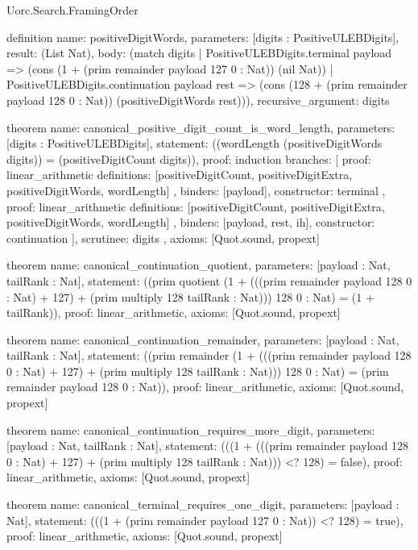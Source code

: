 \begin{lexlean}{Uorc.Search.FramingOrder}
\begin{semanticmodule}
definition{
  name: positiveDigitWords,
  parameters: [digits : PositiveULEBDigits],
  result: (List Nat),
  body: (match digits
    | PositiveULEBDigits.terminal payload => (cons (1 + (prim remainder payload 127 0 : Nat)) (nil Nat))
    | PositiveULEBDigits.continuation payload rest => (cons (128 + (prim remainder payload 128 0 : Nat)) (positiveDigitWords rest))),
  recursive_argument: digits
}

theorem{
  name: canonical_positive_digit_count_is_word_length,
  parameters: [digits : PositiveULEBDigits],
  statement: ((wordLength (positiveDigitWords digits)) = (positiveDigitCount digits)),
  proof: induction{
    branches: [
      {
        proof: linear_arithmetic{
          definitions: [positiveDigitCount, positiveDigitExtra, positiveDigitWords, wordLength]
        },
        binders: [payload],
        constructor: terminal
      },
      {
        proof: linear_arithmetic{
          definitions: [positiveDigitCount, positiveDigitExtra, positiveDigitWords, wordLength]
        },
        binders: [payload, rest, ih],
        constructor: continuation
      }
    ],
    scrutinee: digits
  },
  axioms: [Quot.sound, propext]
}

theorem{
  name: canonical_continuation_quotient,
  parameters: [payload : Nat, tailRank : Nat],
  statement: ((prim quotient (1 + (((prim remainder payload 128 0 : Nat) + 127) + (prim multiply 128 tailRank : Nat))) 128 0 : Nat) = (1 + tailRank)),
  proof: linear_arithmetic{},
  axioms: [Quot.sound, propext]
}

theorem{
  name: canonical_continuation_remainder,
  parameters: [payload : Nat, tailRank : Nat],
  statement: ((prim remainder (1 + (((prim remainder payload 128 0 : Nat) + 127) + (prim multiply 128 tailRank : Nat))) 128 0 : Nat) = (prim remainder payload 128 0 : Nat)),
  proof: linear_arithmetic{},
  axioms: [Quot.sound, propext]
}

theorem{
  name: canonical_continuation_requires_more_digit,
  parameters: [payload : Nat, tailRank : Nat],
  statement: (((1 + (((prim remainder payload 128 0 : Nat) + 127) + (prim multiply 128 tailRank : Nat))) <? 128) = false),
  proof: linear_arithmetic{},
  axioms: [Quot.sound, propext]
}

theorem{
  name: canonical_terminal_requires_one_digit,
  parameters: [payload : Nat],
  statement: (((1 + (prim remainder payload 127 0 : Nat)) <? 128) = true),
  proof: linear_arithmetic{},
  axioms: [Quot.sound, propext]
}


\end{semanticmodule}
\end{lexlean}

